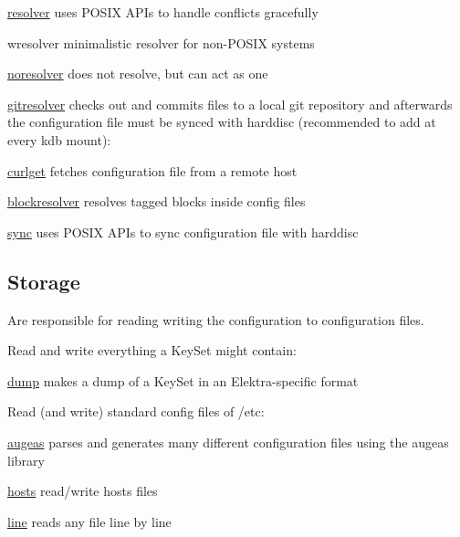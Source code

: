 \begin{DoxyItemize}
\item \hyperlink{md_src_plugins_resolver_README_src_plugins_resolver_README_md}{resolver} uses P\+O\+S\+I\+X A\+P\+Is to handle conflicts gracefully
\item wresolver minimalistic resolver for non-\/\+P\+O\+S\+I\+X systems
\item \hyperlink{md_src_plugins_noresolver_README_src_plugins_noresolver_README_md}{noresolver} does not resolve, but can act as one
\item \hyperlink{md_src_plugins_gitresolver_README_src_plugins_gitresolver_README_md}{gitresolver} checks out and commits files to a local git repository and afterwards the configuration file must be synced with harddisc (recommended to add at every kdb mount)\+:
\item \hyperlink{md_src_plugins_curlget_README_src_plugins_curlget_README_md}{curlget} fetches configuration file from a remote host
\item \hyperlink{md_src_plugins_blockresolver_README_src_plugins_blockresolver_README_md}{blockresolver} resolves tagged blocks inside config files
\item \hyperlink{md_src_plugins_sync_README_src_plugins_sync_README_md}{sync} uses P\+O\+S\+I\+X A\+P\+Is to sync configuration file with harddisc
\end{DoxyItemize}

\subsection*{Storage}

Are responsible for reading writing the configuration to configuration files.

Read and write everything a Key\+Set might contain\+:


\begin{DoxyItemize}
\item \hyperlink{md_src_plugins_dump_README_src_plugins_dump_README_md}{dump} makes a dump of a Key\+Set in an Elektra-\/specific format
\end{DoxyItemize}

Read (and write) standard config files of /etc\+:


\begin{DoxyItemize}
\item \hyperlink{md_src_plugins_augeas_README_src_plugins_augeas_README_md}{augeas} parses and generates many different configuration files using the augeas library
\item \hyperlink{md_src_plugins_hosts_README_src_plugins_hosts_README_md}{hosts} read/write hosts files
\item \hyperlink{md_src_plugins_line_README_src_plugins_line_README_md}{line} reads any file line by line
\end{DoxyItemize}

